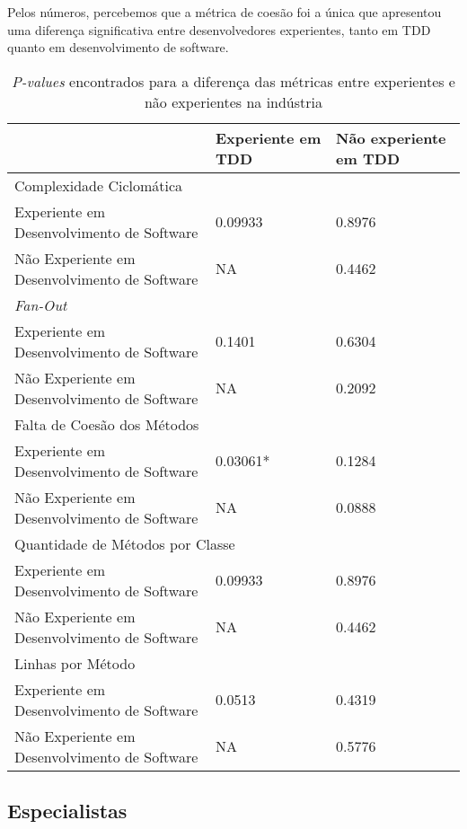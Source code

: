 \documentclass[conference]{IEEEtran}
\begin{document}
Pelos números, percebemos 
que a métrica de coesão foi a única que apresentou uma diferença significativa entre desenvolvedores
experientes, tanto em TDD quanto em desenvolvimento de software.

\begin{table}
	\centering
	\begin{tabular}{ | p{3cm} | p{2cm} | p{2cm} | }
		\hline
		  & Experiente em TDD & Não experiente em TDD \\
		\hline
			\multicolumn{3}{|l|}{Complexidade Ciclomática} \\
		\hline
			Experiente em Desenvolvimento de Software 		& 0.09933	&	0.8976\\
			\hline
			Não Experiente em Desenvolvimento de Software 	& NA		&	0.4462\\
		\hline
			\multicolumn{3}{|l|}{\textit{Fan-Out}}\\
		\hline
			Experiente em Desenvolvimento de Software 		& 0.1401	&	0.6304\\
			\hline
			Não Experiente em Desenvolvimento de Software 	& NA		&	0.2092\\
		\hline
			\multicolumn{3}{|l|}{Falta de Coesão dos Métodos}\\
		\hline
			Experiente em Desenvolvimento de Software 		& \cellcolor[gray]{0.8}0.03061*	&	0.1284\\
			\hline
			Não Experiente em Desenvolvimento de Software 	& NA		&	0.0888\\
		\hline
			\multicolumn{3}{|l|}{Quantidade de Métodos por Classe} \\
		\hline
			Experiente em Desenvolvimento de Software 		& 0.09933	&	0.8976\\
			\hline
			Não Experiente em Desenvolvimento de Software 	& NA		&	0.4462\\
		\hline
			\multicolumn{3}{|l|}{Linhas por Método}\\
		\hline
			Experiente em Desenvolvimento de Software 		& 0.0513	&	0.4319\\
			\hline
			Não Experiente em Desenvolvimento de Software 	& NA		&	0.5776\\
		\hline
	\end{tabular}
	\caption{\textit{P-values} encontrados para a diferença das métricas entre experientes e não experientes na indústria}
	\label{valores-separados}
\end{table}

\subsection{Especialistas}
\end{document}
